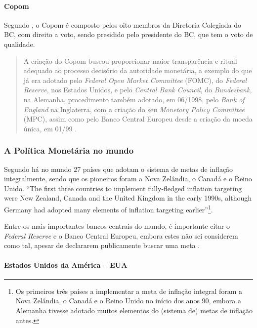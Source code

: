 \documentclass[]{article}
\let\oldparagraph\paragraph
\renewcommand{\paragraph}[1]{\oldparagraph{#1}\mbox{}}
\let\rmarkdownfootnote\footnote%
\def\footnote{\protect\rmarkdownfootnote}
\begin{document}
\paragraph{Copom}\label{copom}

Segundo , o Copom é composto pelos oito
membros da Diretoria Colegiada do BC, com direito a voto, sendo
presidido pelo presidente do BC, que tem o voto de qualidade.

\begin{quote}
A criação do Copom buscou proporcionar maior transparência e ritual
adequado ao processo decisório da autoridade monetária, a exemplo do que
já era adotado pelo \emph{Federal Open Market Committee} (FOMC), do
\emph{Federal Reserve}, nos Estados Unidos, e pelo \emph{Central Bank
Council}, do \emph{Bundesbank}, na Alemanha, procedimento também
adotado, em 06/1998, pelo \emph{Bank of England} na Inglaterra, com a
criação do seu \emph{Monetary Policy Committee} (MPC), assim como pelo
Banco Central Europeu desde a criação da moeda única, em 01/99
\cite[p.~61]{fortuna2015}.
\end{quote}

\subsubsection{A Política Monetária no mundo}\label{subsec:pol_mon_mun}

Segundo  há no mundo 27 países que adotam
o sistema de metas de inflação integralmente, sendo que os pioneiros
foram a Nova Zelândia, o Canadá e o Reino Unido. ``The first three
countries to implement fully-fledged inflation targeting were New
Zealand, Canada and the United Kingdom in the early 1990s, although
Germany had adopted many elements of inflation targeting
earlier''\footnote{Os primeiros três países a implementar a meta de
  inflação integral foram a Nova Zelândia, o Canadá e o Reino Unido no
  início dos anos 90, embora a Alemanha tivesse adotado muitos elementos
  do (sistema de) metas de inflação antes.}.

Entre os mais importantes bancos centrais do mundo, é importante citar o
\emph{Federal Reserve} e o Banco Central Europeu, embora estes não sei
considerem como tal, apesar de declararem publicamente buscar uma meta
\cite{inflationtargeting}.

\paragraph{Estados Unidos da América --
EUA}\label{estados-unidos-da-america-eua}
\end{document}
